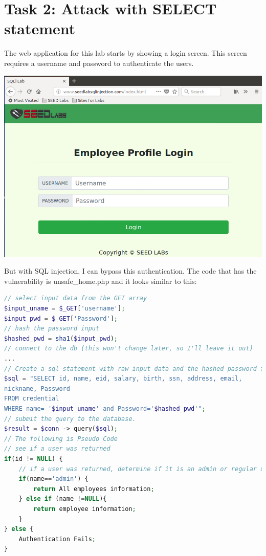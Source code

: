 \documentclass[14pt]{extarticle}
\begin{document}
\section{Task 2: Attack with SELECT statement}
The web application for this lab starts by showing a login screen. This screen requires a username and password to authenticate the users\cite{seed-sqlatk}.\\
\begin{center}
\includegraphics[width=\linewidth]{home-page}\\
\end{center}
But with SQL injection, I can bypass this authentication. The code that has the vulnerability is unsafe\_home.php and it looks similar to this\cite{seed-sqlatk}:
\begin{lstlisting}[language=php]
// select input data from the GET array
$input_uname = $_GET['username'];
$input_pwd = $_GET['Password'];
// hash the password input
$hashed_pwd = sha1($input_pwd);
// connect to the db (this won't change later, so I'll leave it out)
...
// Create a sql statement with raw input data and the hashed password field
$sql = "SELECT id, name, eid, salary, birth, ssn, address, email,
nickname, Password
FROM credential
WHERE name= '$input_uname' and Password='$hashed_pwd'";
// submit the query to the database.
$result = $conn -> query($sql);
// The following is Pseudo Code
// see if a user was returned
if(id != NULL) {
	// if a user was returned, determine if it is an admin or regular user
	if(name=='admin') {
		return All employees information;
	} else if (name !=NULL){
		return employee information;
	}
} else {
	Authentication Fails;
}
\end{lstlisting}
\end{document}
